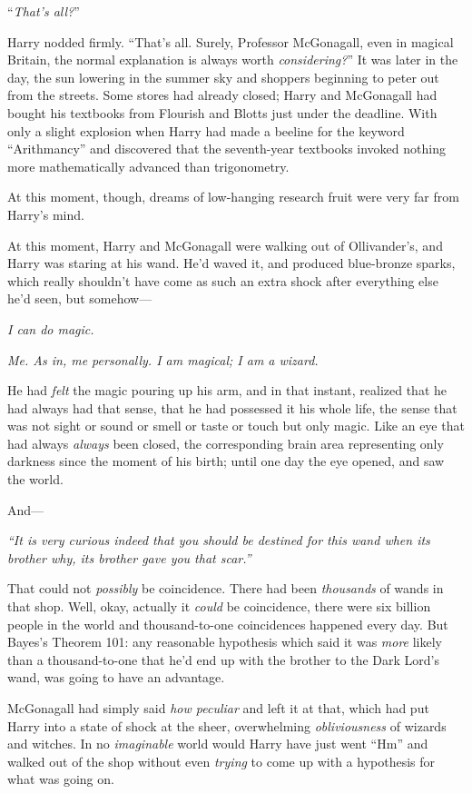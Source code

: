 “\emph{That’s all?}”

Harry nodded firmly. “That’s all. Surely, Professor McGonagall, even in magical Britain, the normal explanation is always worth \emph{considering?}”
\sbreak
It was later in the day, the sun lowering in the summer sky and shoppers beginning to peter out from the streets. Some stores had already closed; Harry and McGonagall had bought his textbooks from Flourish and Blotts just under the deadline. With only a slight explosion when Harry had made a beeline for the keyword “Arithmancy” and discovered that the seventh-year textbooks invoked nothing more mathematically advanced than trigonometry.

At this moment, though, dreams of low-hanging research fruit were very far from Harry’s mind.

At this moment, Harry and McGonagall were walking out of Ollivander’s, and Harry was staring at his wand. He’d waved it, and produced blue-bronze sparks, which really shouldn’t have come as such an extra shock after everything else he’d seen, but somehow—

\emph{I can do magic.}

\emph{Me. As in, me personally. I am magical; I am a wizard.}

He had \emph{felt} the magic pouring up his arm, and in that instant, realized that he had always had that sense, that he had possessed it his whole life, the sense that was not sight or sound or smell or taste or touch but only magic. Like an eye that had always \emph{always} been closed, the corresponding brain area representing only darkness since the moment of his birth; until one day the eye opened, and saw the world.

And—

\emph{“It is very curious indeed that you should be destined for this wand when its brother why, its brother gave you that scar.”}

That could not \emph{possibly} be coincidence. There had been \emph{thousands} of wands in that shop. Well, okay, actually it \emph{could} be coincidence, there were six billion people in the world and thousand-to-one coincidences happened every day. But Bayes’s Theorem 101: any reasonable hypothesis which said it was \emph{more} likely than a thousand-to-one that he’d end up with the brother to the Dark Lord’s wand, was going to have an advantage.

McGonagall had simply said \emph{how peculiar} and left it at that, which had put Harry into a state of shock at the sheer, overwhelming \emph{obliviousness} of wizards and witches. In no \emph{imaginable} world would Harry have just went “Hm” and walked out of the shop without even \emph{trying} to come up with a hypothesis for what was going on.

